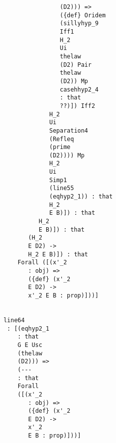 \documentclass[12pt]{article}
\begin{document}
\begin{verbatim}
                                                       (D2))) => 
                                                       ({def} Oridem 
                                                       (sillyhyp_9 
                                                       Iff1 
                                                       H_2 
                                                       Ui 
                                                       thelaw 
                                                       (D2) Pair 
                                                       thelaw 
                                                       (D2)) Mp 
                                                       casehhyp2_4 
                                                       : that 
                                                       ??)]) Iff2 
                                                    H_2 
                                                    Ui 
                                                    Separation4 
                                                    (Refleq 
                                                    (prime 
                                                    (D2)))) Mp 
                                                    H_2 
                                                    Ui 
                                                    Simp1 
                                                    (line55 
                                                    (eqhyp2_1)) : that 
                                                    H_2 
                                                    E B)]) : that 
                                                 H_2 
                                                 E B)]) : that 
                                              (H_2 
                                              E D2) -> 
                                              H_2 E B)]) : that 
                                           Forall ([(x'_2 
                                              : obj) => 
                                              ({def} (x'_2 
                                              E D2) -> 
                                              x'_2 E B : prop)]))]


                                       line64 
                                        : [(eqhyp2_1 
                                           : that 
                                           G E Usc 
                                           (thelaw 
                                           (D2))) => 
                                           (--- 
                                           : that 
                                           Forall 
                                           ([(x'_2 
                                              : obj) => 
                                              ({def} (x'_2 
                                              E D2) -> 
                                              x'_2 
                                              E B : prop)]))]



\end{verbatim}
\end{document}
